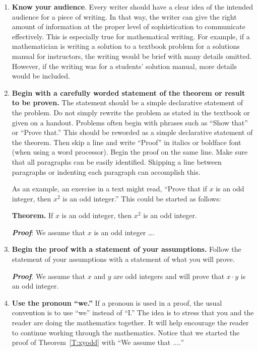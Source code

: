 \begin{enumerate}
\item \textbf{Know your audience}. 
\label{writing:know}%
Every writer should have a clear idea of the intended audience for a piece of writing.  In that way, the writer can give the right amount of information at the proper level of sophistication to communicate effectively.  This is especially true for mathematical writing.  For example, if a mathematician is writing a solution to a textbook problem for a solutions manual for instructors, the writing would be brief with many details omitted.  However, if the writing was for a students' solution manual, more details would be included.  %


\item \textbf{Begin with a carefully worded statement of the theorem or result to be proven.}
The statement should be a simple declarative statement of the problem.  Do not simply rewrite the problem as stated in the textbook or given on a handout.  Problems often begin with phrases such as ``Show that'' or ``Prove that.''  This should be reworded as a simple declarative statement of the theorem.  Then skip a line and write ``Proof''  in italics or boldface font (when using a word processor).  Begin the proof on the same line.  Make sure that all paragraphs can be easily identified.  Skipping a line between paragraphs or indenting each paragraph can accomplish this.

As an example, an exercise in a text might read, ``Prove that if $x$  is an odd integer, then $x^2$ is an odd integer.''  This could be started as follows:

\textbf{Theorem.} 
If  $x$  is an odd integer, then $x^2$ is an odd integer.

\textbf{\emph{Proof}}:  We assume that  $x$  is an odd integer  \ldots .

\item \textbf{Begin the proof with a statement of your assumptions.}
Follow the statement of your assumptions with a statement of what you will prove.
\begin{flushleft}
\emph{\textbf{Proof}}.  We assume that  $x$  and  $y$  are odd integers and will prove that $x \cdot y$   is an odd integer.
\end{flushleft}

\item \textbf{Use the pronoun ``we.''}
If a pronoun is used in a proof, the usual convention is to use ``we'' instead of ``I.''  The idea is to stress that you and the reader are doing the mathematics together.  It will help encourage the reader to continue working through the mathematics.  Notice that we started the proof of Theorem~\ref{T:xyodd} with ``We assume that $\ldots .$''


\end{enumerate}
